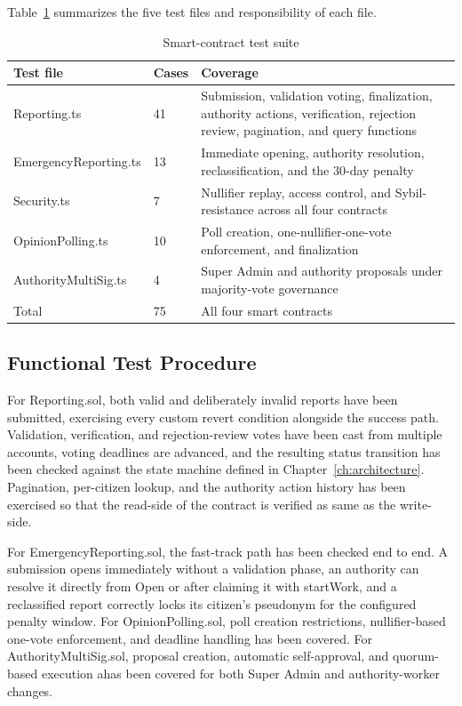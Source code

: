 Table~\ref{tab:contract-inventory} summarizes the five test files and responsibility of each file.

\begin{table}[htbp]
\centering
\caption{Smart-contract test suite}
\label{tab:contract-inventory}
\begin{tabular}{p{}|p{}|p{}}
    
    Test file & Cases & Coverage \\
    \hline
    Reporting.ts & 41 & Submission, validation voting, finalization, authority actions, verification, rejection review, pagination, and query functions \\
    \hline
   EmergencyReporting.ts & 13 & Immediate opening, authority resolution, reclassification, and the 30-day penalty \\
    \hline
    Security.ts & 7 & Nullifier replay, access control, and Sybil-resistance across all four contracts \\
    \hline
   OpinionPolling.ts & 10 & Poll creation, one-nullifier-one-vote enforcement, and finalization \\
    \hline
    AuthorityMultiSig.ts & 4 & Super Admin and authority proposals under majority-vote governance \\
    \hline
    Total & 75 & All four smart contracts \\
    
\end{tabular}
\end{table}

\subsection{Functional Test Procedure}

For Reporting.sol, both valid and deliberately invalid reports have been submitted, exercising every custom revert condition alongside the success path. Validation, verification, and rejection-review votes have been cast from multiple accounts, voting deadlines are advanced, and the resulting status transition has been checked against the state machine defined in Chapter~\ref{ch:architecture}. Pagination, per-citizen lookup, and the authority action history has been exercised so that the read-side of the contract is verified as same as the write-side.

For EmergencyReporting.sol, the fast-track path has been checked end to end. A submission opens immediately without a validation phase, an authority can resolve it directly from Open or after claiming it with startWork, and a reclassified report correctly locks its citizen's pseudonym for the configured penalty window. For OpinionPolling.sol, poll creation restrictions, nullifier-based one-vote enforcement, and deadline handling has been covered. For AuthorityMultiSig.sol, proposal creation, automatic self-approval, and quorum-based execution ahas been covered for both Super Admin and authority-worker changes.
